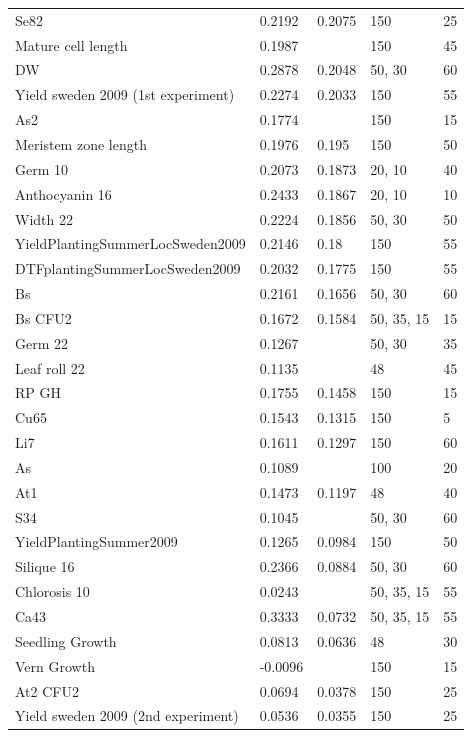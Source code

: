 \begin{longtable}{p{} p{} p{} p{} p{}}
  Se82 & 0.2192 & 0.2075 & 150 & 25 \\
  Mature cell length & 0.1987 & \color{red}{0.2052} & 150 & 45 \\
  DW  & 0.2878 & 0.2048 & 50, 30 & 60 \\
  Yield sweden 2009 (1st experiment) & 0.2274 & 0.2033 & 150 & 55 \\
  As2 & 0.1774 & \color{red}{0.1962} & 150 & 15 \\
  Meristem zone length & 0.1976 & 0.195 & 150 & 50 \\
  Germ 10 & 0.2073 & 0.1873 & 20, 10 & 40 \\
  Anthocyanin 16 & 0.2433 & 0.1867 & 20, 10 & 10 \\
  Width 22 & 0.2224 & 0.1856 & 50, 30 & 50 \\
  YieldPlantingSummerLocSweden2009 & 0.2146 & 0.18 & 150 & 55 \\
  DTFplantingSummerLocSweden2009 & 0.2032 & 0.1775 & 150 & 55 \\
  Bs & 0.2161 & 0.1656 & 50, 30 & 60 \\
  Bs CFU2 & 0.1672 & 0.1584 & 50, 35, 15 & 15 \\
  Germ 22 & 0.1267 & \color{red}{0.1533} & 50, 30 & 35 \\
  Leaf roll 22 & 0.1135 & \color{red}{0.1511} & 48 & 45 \\
  RP GH & 0.1755 & 0.1458 & 150 & 15 \\
  Cu65 & 0.1543 & 0.1315 & 150 & 5 \\
  Li7 & 0.1611 & 0.1297 & 150 & 60 \\
  As & 0.1089 & \color{red}{0.1227} & 100 & 20 \\
  At1 & 0.1473 & 0.1197 & 48 & 40 \\
  S34 & 0.1045 & \color{red}{0.11} & 50, 30 & 60 \\
  YieldPlantingSummer2009 & 0.1265 & 0.0984 & 150 & 50 \\
  Silique 16 & 0.2366 & 0.0884 & 50, 30 & 60 \\
  Chlorosis 10 & 0.0243 & \color{red}{0.088} & 50, 35, 15 & 55 \\
  Ca43 & 0.3333 & 0.0732 & 50, 35, 15 & 55 \\
  Seedling Growth & 0.0813 & 0.0636 & 48 & 30 \\
  Vern Growth & -0.0096 & \color{red}{0.0422} & 150 & 15 \\
  At2 CFU2 & 0.0694 & 0.0378 & 150 & 25 \\
  Yield sweden 2009 (2nd experiment) & 0.0536 & 0.0355 & 150 & 25 \\

\end{longtable}
